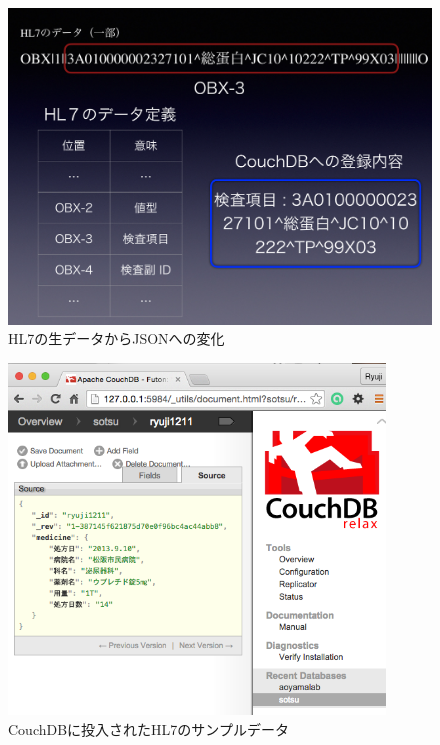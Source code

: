 			\begin{figure}[htbp]
				\begin{center}
					\includegraphics[width=15cm, bb=0 0 1435 1073]{./gazou/hl7-data-trans2.png}
				\end{center}
				\caption{HL7の生データからJSONへの変化}
				\label{hl7-data-trans}
			\end{figure}

			\begin{figure}[htbp]
				\begin{center}
					\includegraphics[width=10cm, bb=0 0 576 573]{./gazou/hl7-data.png}
				\end{center}
				\caption{CouchDBに投入されたHL7のサンプルデータ}
				\label{hl7-data}
			\end{figure}



